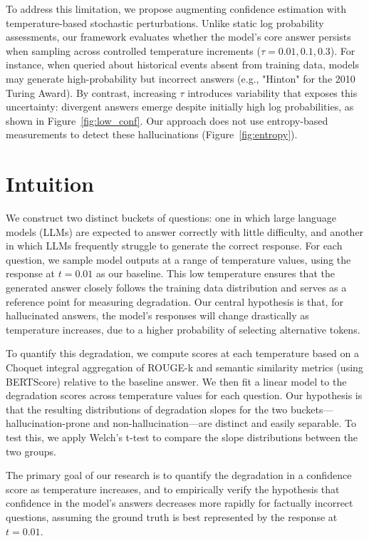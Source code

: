 \documentclass[sigconf]{acmart}
\begin{document}
To address this limitation, we propose augmenting confidence estimation with temperature-based stochastic perturbations. Unlike static log probability assessments, our framework evaluates whether the model's core answer persists when sampling across controlled temperature increments ($\tau = 0.01, 0.1, 0.3$). For instance, when queried about historical events absent from training data, models may generate high-probability but incorrect answers (e.g., "Hinton" for the 2010 Turing Award). By contrast, increasing $\tau$ introduces variability that exposes this uncertainty: divergent answers emerge despite initially high log probabilities, as shown in Figure~\ref{fig:low_conf}. Our approach does not use entropy-based measurements to detect these hallucinations (Figure~\ref{fig:entropy}).


\section{Intuition}

We construct two distinct buckets of questions: one in which large language models (LLMs) are expected to answer correctly with little difficulty, and another in which LLMs frequently struggle to generate the correct response. For each question, we sample model outputs at a range of temperature values, using the response at $t = 0.01$ as our baseline. This low temperature ensures that the generated answer closely follows the training data distribution and serves as a reference point for measuring degradation. Our central hypothesis is that, for hallucinated answers, the model's responses will change drastically as temperature increases, due to a higher probability of selecting alternative tokens.

To quantify this degradation, we compute scores at each temperature based on a Choquet integral aggregation of ROUGE-k \cite{lin2004rouge} and semantic similarity metrics (using BERTScore) \cite{bertscore} relative to the baseline answer. We then fit a linear model to the degradation scores across temperature values for each question. Our hypothesis is that the resulting distributions of degradation slopes for the two buckets—hallucination-prone and non-hallucination—are distinct and easily separable. To test this, we apply Welch's t-test to compare the slope distributions between the two groups.

The primary goal of our research is to quantify the degradation in a confidence score as temperature increases, and to empirically verify the hypothesis that confidence in the model's answers decreases more rapidly for factually incorrect questions, assuming the ground truth is best represented by the response at $t = 0.01$.
\end{document}
